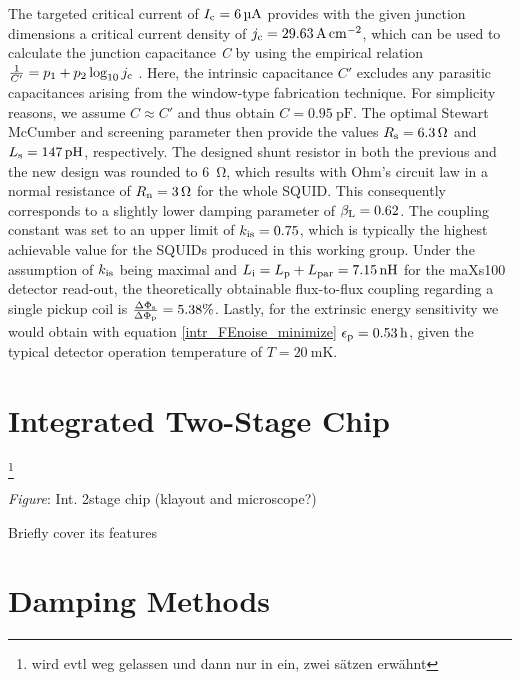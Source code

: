 
The targeted critical current of $I_{\rm c}=\qty{6}{\micro\ampere}$ provides with the given junction dimensions a critical current density of $j_{\rm c}=\qty{29.63}{\ampere\per\cm\squared}$, which can be used to calculate the junction capacitance \textit{C} by using the empirical relation $\frac{1}{C'}=p_1 + p_2\log_{10}j_{\rm c}$ \cite{Maezawa1995}. Here, the intrinsic capacitance $C'$ excludes any parasitic capacitances arising from the window-type fabrication technique. For simplicity reasons, we assume $C\approx C'$ and thus obtain $C=\qty{0.95}{\pico\farad}$. The optimal Stewart McCumber and screening parameter then provide the values $R_{\rm s}=\qty{6.3}{\ohm}$ and $L_{\rm s}=\qty{147}{\pico\henry}$, respectively. The designed shunt resistor in both the previous and the new design was rounded to \qty{6}{\ohm}, which results with Ohm's circuit law in a normal resistance of $R_{\rm n}=\qty{3}{\ohm}$ for the whole SQUID. This consequently corresponds to a slightly lower damping parameter of $\beta_{\rm L}=0.62$. The coupling constant was set to an upper limit of $k_{\rm is}=0.75$, which is typically the highest achievable value for the SQUIDs produced in this working group. Under the assumption of $k_{\rm is}$ being maximal and $L_{\rm i}=L_{\rm p}+L_{\rm par}=\qty{7.15}{\nano\henry}$ for the maXs100 detector read-out, the theoretically obtainable flux-to-flux coupling regarding a single pickup coil is $\frac{\Delta\Phi_{\rm s}}{\Delta\Phi_{\rm p}}=5.38\%$. Lastly, for the extrinsic energy sensitivity we would obtain with equation \ref{intr_FEnoise_minimize} $\epsilon_{\rm p}=\qty{0.53}{h}$, given the typical detector operation temperature of $T=\qty{20}{\milli\kelvin}$.   


\section{Integrated Two-Stage Chip}\footnote{wird evtl weg gelassen und dann nur in ein, zwei sätzen erwähnt} 

\textit{Figure}: Int. 2stage chip (klayout and microscope?)

Briefly cover its features

\section{Damping Methods} \label{sec_damping}

